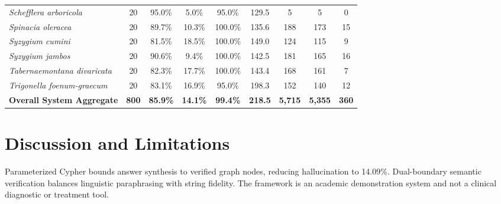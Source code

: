 \begin{table}[htbp]
\begin{tabular}{@{}l c c c c c c c c@{}}
\textit{Schefflera arboricola} & 20 & 95.0\% & 5.0\% & 95.0\% & 129.5 & 5 & 5 & 0 \\
\textit{Spinacia oleracea} & 20 & 89.7\% & 10.3\% & 100.0\% & 135.6 & 188 & 173 & 15 \\
\textit{Syzygium cumini} & 20 & 81.5\% & 18.5\% & 100.0\% & 149.0 & 124 & 115 & 9 \\
\textit{Syzygium jambos} & 20 & 90.6\% & 9.4\% & 100.0\% & 142.5 & 181 & 165 & 16 \\
\textit{Tabernaemontana divaricata} & 20 & 82.3\% & 17.7\% & 100.0\% & 143.4 & 168 & 161 & 7 \\
\textit{Trigonella foenum-graecum} & 20 & 83.1\% & 16.9\% & 95.0\% & 198.3 & 152 & 140 & 12 \\
\hline
\textbf{Overall System Aggregate} & \textbf{800} & \textbf{85.9\%} & \textbf{14.1\%} & \textbf{99.4\%} & \textbf{218.5} & \textbf{5,715} & \textbf{5,355} & \textbf{360} \\
\hline
\end{tabular}
\end{table}

\section{Discussion and Limitations}

Parameterized Cypher bounds answer synthesis to verified graph nodes, reducing hallucination to 14.09\%. Dual-boundary semantic verification balances linguistic paraphrasing with string fidelity. The framework is an academic demonstration system and not a clinical diagnostic or treatment tool.

